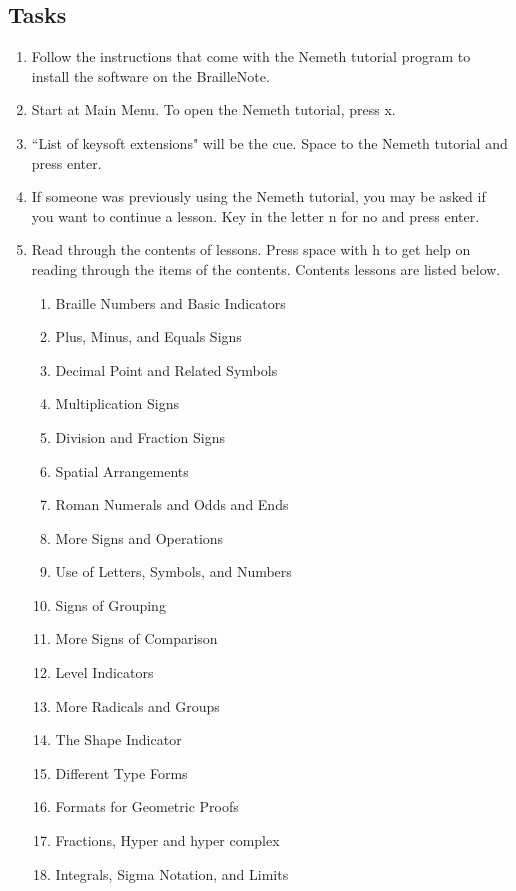 \documentclass[10pt,letterpaper,twoside]{report}
\begin{document}
{{{\subsection{Tasks}
\begin{enumerate}
	\item Follow the instructions that come with the Nemeth tutorial program to install the software on the BrailleNote.
	\item Start at Main Menu.  To open the Nemeth tutorial, press x.
	\item ``List of keysoft extensions" will be the cue.  Space to the Nemeth tutorial and press enter.
	\item If someone was previously using the Nemeth tutorial, you may be asked if you want to continue a lesson.  Key in the letter n for no and press enter.
	\item Read through the contents of lessons.  Press space with h to get help on reading through the items of the contents.  Contents lessons are listed below.
	      \begin{enumerate}
		      \item Braille Numbers and Basic Indicators
		      \item Plus, Minus, and Equals Signs
		      \item Decimal Point and Related Symbols
		      \item Multiplication Signs
		      \item Division and Fraction Signs
		      \item Spatial Arrangements
		      \item Roman Numerals and Odds and Ends
		      \item More Signs and Operations
		      \item Use of Letters, Symbols, and Numbers
		      \item Signs of Grouping
		      \item More Signs of Comparison
		      \item Level Indicators
		      \item More Radicals and Groups
		      \item The Shape Indicator
		      \item Different Type Forms
		      \item Formats for Geometric Proofs
		      \item Fractions, Hyper and hyper complex
		      \item Integrals, Sigma Notation, and Limits
	      \end{enumerate}

\end{enumerate}}}}
\end{document}
